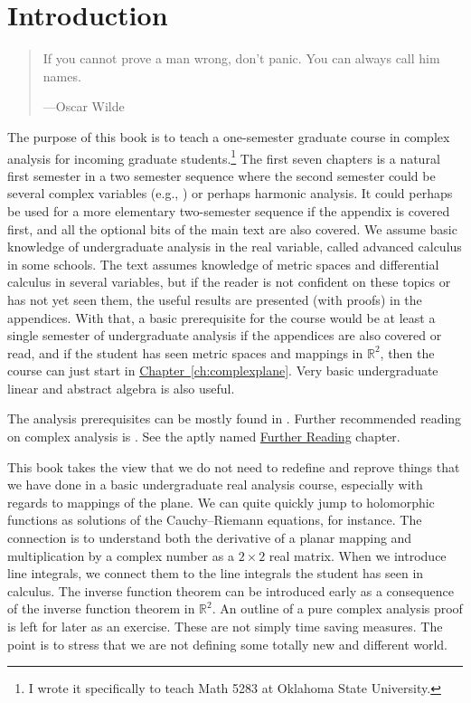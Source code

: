 \documentclass[12pt,openany]{book}
\newcommand{\R}{{\mathbb{R}}}
\theoremstyle{plain}
\theoremstyle{remark}
\theoremstyle{definition}
\newenvironment{myepigraph}{%
    \begin{quote}%
    \begingroup\itshape
}{%
    \endgroup%
    \end{quote}
}
\theoremstyle{exercise}
\theoremstyle{example}
\newcommand{\Chapterref}[1]{\hyperref[#1]{Chapter~\ref*{#1}}}
\begin{document}
\chapter*{Introduction} \label{ch:intro}

\begin{myepigraph}
If you cannot prove a man wrong, don't panic. You can always call him names.

---Oscar Wilde 
\end{myepigraph}

The purpose of this book is to teach a one-semester graduate course in
complex analysis for incoming graduate students.\footnote{I wrote it
specifically to teach Math 5283 at Oklahoma State University.}
The first seven chapters is a natural first semester in a two semester sequence where the second
semester could be several complex variables (e.g., \cite{scv:book})
or perhaps harmonic analysis.
It could perhaps be used for a more elementary two-semester sequence if the
appendix is covered first, and all the optional bits of the main text are
also covered.
We assume basic knowledge of undergraduate
analysis in the real variable, called advanced calculus in some schools.
The text assumes knowledge of metric spaces
and differential calculus in several variables, but if the reader is not
confident on these topics or has not yet seen them, the useful results
are presented (with proofs) in the appendices.
With that, a basic prerequisite for the
course would be at least a single semester of undergraduate analysis if the
appendices are also covered or read, and if the student has
seen metric spaces and mappings in $\R^2$, then the course
can just start in \Chapterref{ch:complexplane}.  Very basic undergraduate
linear and abstract algebra is also useful.

The analysis prerequisites can be mostly found in
\cites{ra:book,ra:book2,Rudin:principles}.  Further recommended
reading on complex analysis is \cites{Boas,Conway1,Conway2,Rudin,Ullrich}.
See the aptly named
\hyperref[ch:furtherreading]{Further Reading} chapter.

This book takes the view that we do not need to redefine and reprove
things that we have done in a basic undergraduate real analysis course,
especially with
regards to mappings of the plane.  We can quite quickly jump to
holomorphic functions as solutions of the Cauchy--Riemann equations,
for instance.
The connection is to understand both the derivative of 
a planar mapping and
multiplication by a complex number
as a $2 \times 2$ real matrix.
When we introduce line integrals, we connect
them to the line integrals the student has seen in calculus.
The inverse function theorem can be introduced early as
a consequence of the inverse function theorem in $\R^2$.
An outline of a pure complex analysis proof is left for later as an exercise.
These are not simply time saving measures.
The point is to stress that we are not defining some totally new and
different world.
\end{document}
